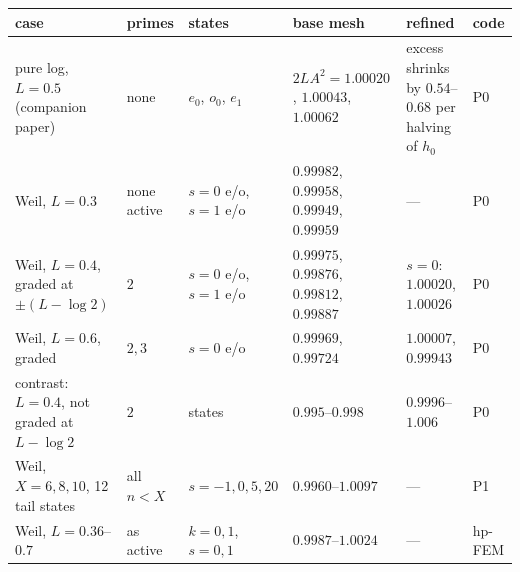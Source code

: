 \begin{tabular}{>{\raggedright\arraybackslash}p{3.3cm}>{\raggedright\arraybackslash}p{1.3cm}>{\raggedright\arraybackslash}p{2.0cm}>{\raggedright\arraybackslash}p{3.7cm}>{\raggedright\arraybackslash}p{3.0cm}l}
\toprule
case & primes & states & base mesh & refined & code \\
\midrule
pure log, $L=0.5$ (companion paper) & none & $e_0$, $o_0$, $e_1$ & $2LA^2=1.00020$, $1.00043$, $1.00062$ & excess shrinks by $0.54$--$0.68$ per halving of $h_0$ & P0 \\
Weil, $L=0.3$ & none active & $s=0$ e/o, $s=1$ e/o & $0.99982$, $0.99958$, $0.99949$, $0.99959$ & --- & P0 \\
Weil, $L=0.4$, graded at $\pm(L-\log2)$ & $2$ & $s=0$ e/o, $s=1$ e/o & $0.99975$, $0.99876$, $0.99812$, $0.99887$ & $s=0$: $1.00020$, $1.00026$ & P0 \\
Weil, $L=0.6$, graded & $2,3$ & $s=0$ e/o & $0.99969$, $0.99724$ & $1.00007$, $0.99943$ & P0 \\
contrast: $L=0.4$, not graded at $L-\log2$ & $2$ & 4 states & $0.995$--$0.998$ & $0.9996$--$1.006$ & P0 \\
\midrule
Weil, $X=6,8,10$, 12 tail states & all $n<X$ & $s=-1,0,5,20$ & $0.9960$--$1.0097$ & --- & P1 \\
Weil, $L=0.36$--$0.7$ & as active & $k=0,1$, $s=0,1$ & $0.9987$--$1.0024$ & --- & hp-FEM \\
\bottomrule
\end{tabular}
